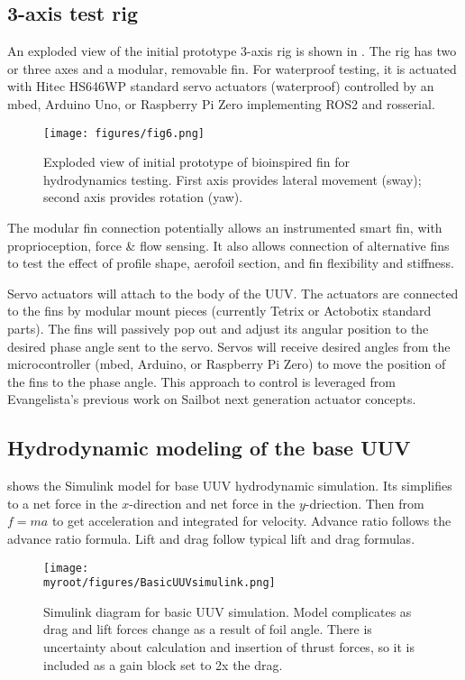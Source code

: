 \documentclass[twocolumn,10pt]{IEEEtran}
\newcommand{\myroot}{.}
\begin{document}
\subsection{3-axis test rig}
An exploded view of the initial prototype 3-axis rig is shown in . The rig has two or three axes and a modular, removable fin. For waterproof testing, it is actuated with Hitec HS646WP standard servo actuators (waterproof) controlled by an mbed, Arduino Uno, or Raspberry Pi Zero implementing ROS2 and rosserial. 
\begin{figure}
\begin{center}
\texttt{[image: figures/fig6.png]}
\end{center}
\caption{Exploded view of initial prototype of bioinspired fin for hydrodynamics testing. First axis provides lateral movement (sway); second axis provides rotation (yaw).}
\label{fig:rig}
\end{figure}
The modular fin connection potentially allows an instrumented smart fin, with proprioception, force \& flow sensing. It also allows connection of alternative fins to test the effect of profile shape, aerofoil section, and fin flexibility and stiffness.

Servo actuators will attach to the body of the UUV.  The actuators are connected to the fins by modular mount pieces (currently Tetrix or Actobotix standard parts).  The fins will passively pop out and adjust its angular position to the desired phase angle sent to the servo.  Servos will receive desired angles from the microcontroller (mbed, Arduino, or Raspberry Pi Zero) to move the position of the fins to the phase angle. This approach to control is leveraged from Evangelista's previous work on Sailbot next generation actuator concepts. 





\subsection{Hydrodynamic modeling of the base UUV}
 shows the Simulink model for base UUV hydrodynamic simulation. Its simplifies to a net force in the $x$-direction and net force in the $y$-driection.  Then from $f=ma$ to get acceleration and integrated for velocity.  Advance ratio follows the advance ratio formula.  Lift and drag follow typical lift and drag formulas.
\begin{figure}
\begin{center}
\texttt{[image: \\myroot/figures/BasicUUVsimulink.png]}
\end{center}
\caption{Simulink diagram for basic UUV simulation.  Model complicates as drag and lift forces change as a result of foil angle.  There is uncertainty about calculation and insertion of thrust forces, so it is included as a gain block set to 2x the drag.}
\label{fig:simulink}
\end{figure}
\end{document}
